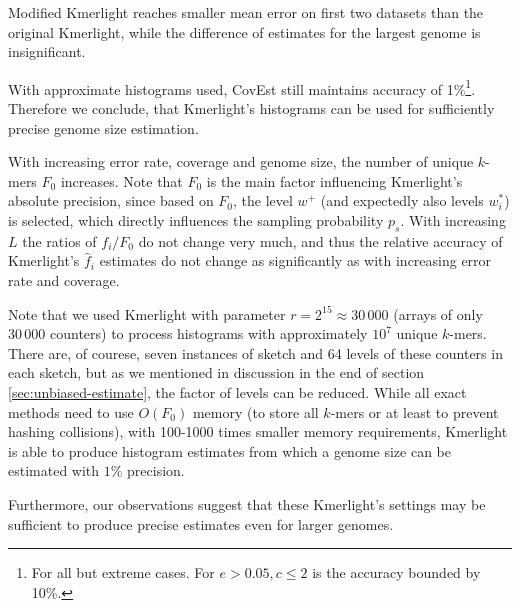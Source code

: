 Modified Kmerlight reaches smaller mean error on first two datasets than the original Kmerlight,
while the difference of estimates for the largest genome is insignificant.

\medskip

With approximate histograms used, CovEst still maintains accuracy of 1\%\footnote{For all but
extreme cases. For $e > 0.05, c \leq 2$ is the accuracy bounded by 10\%.}. Therefore we conclude,
that Kmerlight's histograms can be used for sufficiently precise genome size estimation. 

With increasing error rate, coverage and genome size, the number of unique $k$-mers $F_0$ increases.
Note that $F_0$ is the main factor influencing Kmerlight's absolute precision, since based on $F_0$,
the level $w^+$ (and expectedly also levels $w_i^*$) is selected, which directly influences the
sampling probability $p_s$. With increasing $L$ the ratios of $f_i/F_0$ do not change very much,
and thus the relative accuracy of Kmerlight's $\hat f_i$ estimates do not change as significantly
as with increasing error rate and coverage.

Note that we used Kmerlight with parameter $r=2^{15} \approx 30\,000$ (arrays of only $30\,000$
counters) to process histograms with approximately $10^7$ unique $k$-mers.
There are, of courese, seven instances of sketch and 64 levels of these counters in each sketch,
but as we mentioned in discussion in the end of section \ref{sec:unbiased-estimate}, the
factor of levels can be reduced. While all exact methods need to use $O(F_0)$ memory 
(to store all $k$-mers or at least to prevent hashing collisions), with 100-1000 times smaller 
memory requirements, Kmerlight is able to produce histogram estimates from which a genome 
size can be estimated with $1\%$ precision. 

Furthermore, our observations suggest that these Kmerlight's settings may be sufficient
to produce precise estimates even for larger genomes.


